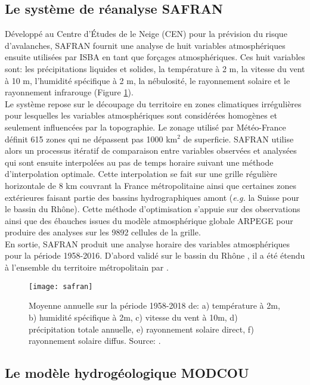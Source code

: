 \subsection*{Le système de réanalyse SAFRAN}

Développé au Centre d'\'Etudes de le Neige (CEN) pour la prévision du risque d'avalanches, SAFRAN fournit une analyse de huit variables atmosphériques ensuite utilisées par ISBA en tant que forçages atmosphériques. Ces huit variables sont: les précipitations liquides et solides, la température à 2 m, la vitesse du vent à 10 m, l'humidité spécifique à 2 m, la nébulosité, le rayonnement solaire et le rayonnement infrarouge (Figure \ref{safran}).\\
Le système repose sur le découpage du territoire en zones climatiques irrégulières pour lesquelles les variables atmosphériques sont considérées homogènes et seulement influencées par la topographie. Le zonage utilisé par Météo-France définit 615 zones qui ne dépassent pas 1000 km$^{2}$ de superficie. SAFRAN utilise alors un processus itératif de comparaison entre variables observées et analysées qui sont ensuite interpolées au pas de temps horaire suivant une méthode d'interpolation optimale. Cette interpolation se fait sur une grille régulière horizontale de 8 km couvrant la France métropolitaine ainsi que certaines zones extérieures faisant partie des bassins hydrographiques amont (\textit{e.g.} la Suisse pour le bassin du Rhône). Cette méthode d'optimisation s'appuie sur des observations ainsi que des ébauches issues du modèle atmosphérique globale ARPEGE pour produire des analyses sur les 9892 cellules de la grille.\\

\noindent En sortie, SAFRAN produit une analyse horaire des variables atmosphériques pour la période 1958-2016. D'abord validé sur le bassin du Rhône \citep{etchevers2001}, il a été étendu à l'ensemble du territoire métropolitain par \citet[][]{lemoigne2002}.

\begin{figure}[h!]
\texttt{[image: safran]}
\caption{Moyenne annuelle sur la période 1958-2018 de: a) température à 2m, b) humidité spécifique à 2m, c) vitesse du vent à 10m, d) précipitation totale annuelle, e) rayonnement solaire direct, f) rayonnement solaire diffus. Source: \citet{lemoigne2020}.}
\label{safran}
\end{figure}
\clearpage

\subsection*{Le modèle hydrogéologique MODCOU}

